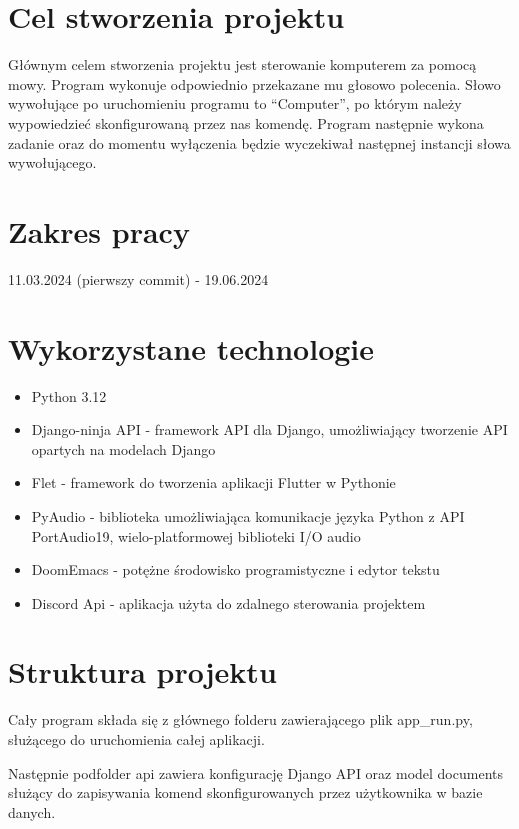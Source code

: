 \documentclass[polish]{article}
\begin{document}
    \section{Cel stworzenia projektu}

        Głównym celem stworzenia projektu jest sterowanie komputerem za pomocą mowy. Program wykonuje odpowiednio przekazane mu głosowo polecenia. Słowo wywołujące po uruchomieniu programu to ``Computer'', po którym należy wypowiedzieć skonfigurowaną przez nas komendę. Program następnie wykona zadanie oraz do momentu wyłączenia będzie wyczekiwał następnej instancji słowa wywołującego.


    \section{Zakres pracy}
        11.03.2024 (pierwszy commit) - 19.06.2024


    \section{Wykorzystane technologie}

        \begin{itemize}

            \item Python 3.12
            \item Django-ninja API - framework API dla Django, umożliwiający tworzenie API opartych na modelach Django
            \item Flet - framework do tworzenia aplikacji Flutter w Pythonie
            \item PyAudio - biblioteka umożliwiająca komunikacje języka Python z API PortAudio19, wielo-platformowej biblioteki I/O audio
            \item DoomEmacs - potężne środowisko programistyczne i edytor tekstu
			\item Discord Api - aplikacja użyta do zdalnego sterowania projektem
        \end{itemize}


    \section{Struktura projektu}

        Cały program składa się z głównego folderu zawierającego plik app\_run.py, służącego do uruchomienia całej aplikacji.
        
        Następnie podfolder api zawiera konfigurację Django API oraz model documents służący do zapisywania komend skonfigurowanych przez użytkownika w bazie danych.
        
\end{document}
